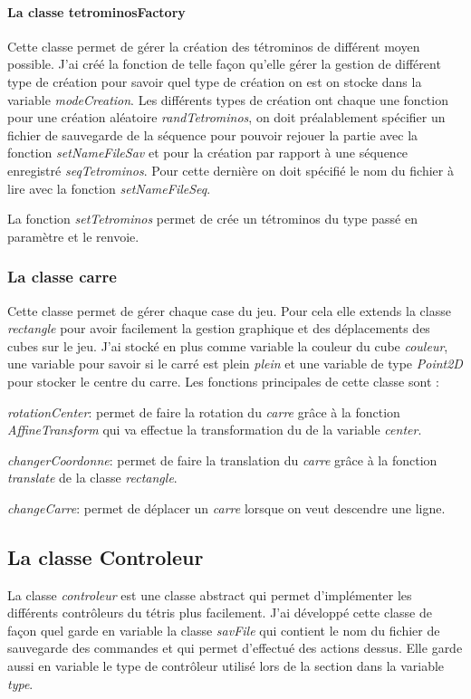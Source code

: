 \documentclass{article}           %
\begin{document}
\paragraph{La classe tetrominosFactory}
Cette classe permet de gérer la création des tétrominos de différent moyen possible. J'ai créé la fonction de telle façon qu'elle gérer la gestion de différent type de création pour savoir quel type de création on est on stocke dans la variable \emph{modeCreation}. Les différents types de création ont chaque une fonction pour une création aléatoire \emph{randTetrominos}, on doit préalablement spécifier un fichier de sauvegarde de la séquence pour pouvoir rejouer la partie avec la fonction \emph{setNameFileSav} et pour la création par rapport à une séquence enregistré \emph{seqTetrominos}.
Pour cette dernière on doit spécifié le nom du fichier à lire avec la fonction \emph{setNameFileSeq}.

La fonction \emph{setTetrominos} permet de crée un tétrominos du type passé en paramètre et le renvoie.

\subsubsection{La classe carre}
Cette classe permet de gérer chaque case du jeu. Pour cela elle extends la classe \emph{rectangle} pour avoir facilement la gestion graphique et des déplacements des cubes sur le jeu.
J'ai stocké en plus comme variable la couleur du cube \emph{couleur}, une variable pour savoir si le carré est plein \emph{plein} et une variable de type \emph{Point2D} pour stocker le centre du carre. Les fonctions principales de cette classe sont :

\emph{rotationCenter}: permet de faire la rotation du \emph{carre} grâce à la fonction \emph{AffineTransform} qui va effectue la transformation du de la variable \emph{center}.

\emph{changerCoordonne}: permet de faire la translation du \emph{carre} grâce à la fonction \emph{translate} de la classe \emph{rectangle}.

\emph{changeCarre}: permet de déplacer un \emph{carre} lorsque on veut descendre une ligne.

\subsection{La classe Controleur}
La classe \emph{controleur} est une classe abstract qui permet d'implémenter les différents contrôleurs du tétris plus facilement. J'ai développé cette classe de façon quel garde en variable la classe \emph{savFile} qui contient le nom du fichier de sauvegarde des commandes et qui permet d'effectué des actions dessus. Elle garde aussi en variable le type de contrôleur utilisé lors de la section dans la variable \emph{type}.
\end{document}
